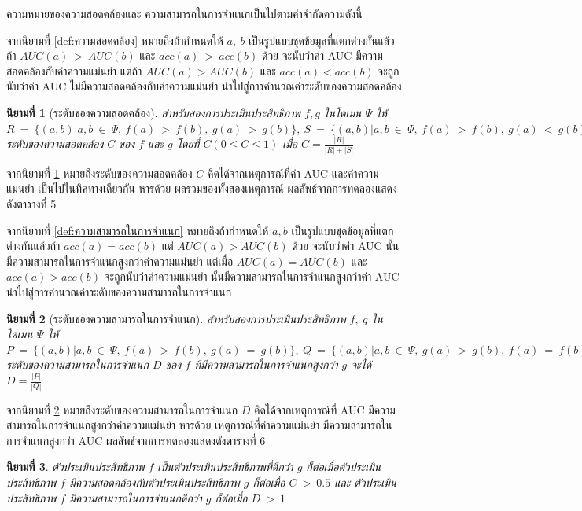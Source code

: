 \documentclass[twoside, twocolumn, 12pt]{article}
\newtheorem{mydef}{นิยามที่}
\begin{document}
ความหมายของความสอดคล้องและ ความสามารถในการจำแนกเป็นไปตามคำจำกัดความดังนี้

จากนิยามที่ \ref{def:ความสอดคล้อง} หมายถึงถ้ากำหนดให้ $a,\:b$ เป็นรูปแบบชุดข้อมูลที่แตกต่างกันแล้วถ้า $AUC(a)\:>\:AUC(b)$ และ $acc(a)\:>\:acc(b)$ ด้วย จะนับว่าค่า AUC มีความสอดคล้องกับค่าความแม่นยำ แต่ถ้า $AUC(a) > AUC(b)$ และ $acc(a) < acc(b)$ จะถูกนับว่าค่า AUC ไม่มีความสอดคล้องกับค่าความแม่นยำ นำไปสู่การคำนวณค่าระดับของความสอดคล้อง

\begin{mydef}[ระดับของความสอดคล้อง]\label{def:ระดับของความสอดคล้อง}
สำหรับสองการประเมินประสิทธิภาพ $f, g$ ในโดเมน $\Psi$ ให้ $R\:=\:\{(a,b)|a,b\:\in\:\Psi,\:f(a)\:>\:f(b),\:g(a)\:>\:g(b)\},\:S\:=\:\{(a,b)|a,b\:\in\:\Psi,\:f(a)\:>\:f(b),\: g(a)\:<\:g(b)\}$ ระดับของความสอดคล้อง $C$ ของ $f$ และ $g$ โดยที่ $C(0 \leq C \leq 1)$ เมื่อ $C = \frac{|R|}{|R|+|S|}$
\end{mydef}
จากนิยามที่ \ref{def:ระดับของความสอดคล้อง} หมายถึงระดับของความสอดคล้อง $C$ คิดได้จากเหตุการณ์ที่ค่า AUC และค่าความแม่นยำ เป็นไปในทิศทางเดียวกัน หารด้วย ผลรวมของทั้งสองเหตุการณ์ ผลลัพธ์จากการทดลองแสดงดังตารางที่ 5

จากนิยามที่ \ref{def:ความสามารถในการจำแนก} หมายถึงถ้ากำหนดให้ $a, b$ เป็นรูปแบบชุดข้อมูลที่แตกต่างกันแล้วถ้า $acc(a)  = acc(b)$ แต่ $AUC(a) > AUC(b)$ ด้วย จะนับว่าค่า AUC นั้นมีความสามารถในการจำแนกสูงกว่าค่าความแม่นยำ แต่เมื่อ  $AUC(a) = AUC(b)$ และ $acc(a) > acc(b)$ จะถูกนับว่าค่าความแม่นยำ นั้นมีความสามารถในการจำแนกสูงกว่าค่า AUC  นำไปสู่การคำนวณค่าระดับของความสามารถในการจำแนก

\begin{mydef}[ระดับของความสามารถในการจำแนก]\label{def:ระดับของความสามารถในการจำแนก}
สำหรับสองการประเมินประสิทธิภาพ $f,\:g$ ในโดเมน $\Psi$ ให้ $P\:=\:\{(a,b)|a,b\:\in\:\Psi,\:f(a)\:>\:f(b),\:g(a)\:=\:g(b)\},\:Q\:=\:\{(a,b)|a,b\:\in\:\Psi,\:g(a)\:>\:g(b),\: f(a)\:=\:f(b)\}$ ระดับของความสามารถในการจำแนก $D$ ของ $f$ ที่มีความสามารถในการจำแนกสูงกว่า $g$ จะได้ $D = \frac{|P|}{|Q|}$
\end{mydef}

จากนิยามที่ \ref{def:ระดับของความสามารถในการจำแนก} หมายถึงระดับของความสามารถในการจำแนก $D$ คิดได้จากเหตุการณ์ที่ AUC มีความสามารถในการจำแนกสูงกว่าค่าความแม่นยำ หารด้วย เหตุการณ์ที่ค่าความแม่นยำ มีความสามารถในการจำแนกสูงกว่า AUC ผลลัพธ์จากการทดลองแสดงดังตารางที่ 6

\begin{mydef}
ตัวประเมินประสิทธิภาพ $f$ เป็นตัวประเมินประสิทธิภาพที่ดีกว่า $g$ ก็ต่อเมื่อตัวประเมินประสิทธิภาพ $f$ มีความสอดคล้องกับตัวประเมินประสิทธิภาพ $g$ ก็ต่อเมื่อ $C\:>\:0.5$ และ ตัวประเมินประสิทธิภาพ $f$ มีความสามารถในการจำแนกดีกว่า $g$ ก็ต่อเมื่อ $D\:>\:1$
\end{mydef}
\end{document}
